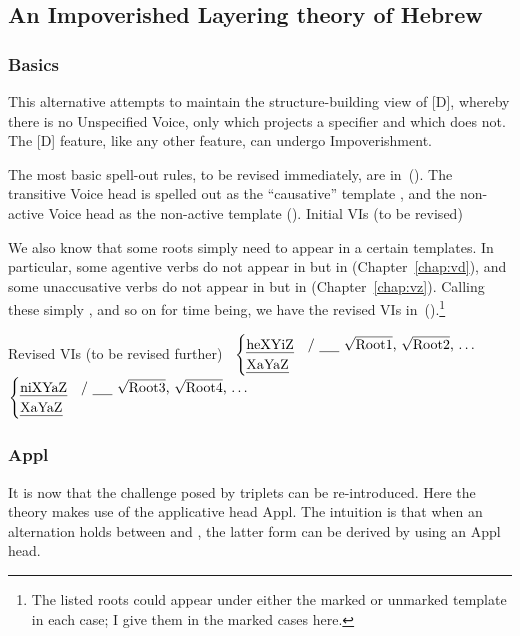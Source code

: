 	\subsection{An Impoverished Layering theory of Hebrew} \label{aas:jim:pros}
		\subsubsection{Basics}
This alternative attempts to maintain the structure-building view of [D], whereby there is no Unspecified Voice, only {\vds} which projects a specifier and {\vzs} which does not. The [D] feature, like any other feature, can undergo Impoverishment.

The most basic spell-out rules, to be revised immediately, are in~(\nextx). The transitive Voice head is spelled out as the ``causative'' template {\thif}, and the non-active Voice head as the non-active template (\tnif).
\pex Initial VIs (to be revised)
	\a {\vds} \lra~{\thif}
	\a {\vzs} \lra~{\tnif}
\xe

We also know that some roots simply need to appear in a certain templates. In particular, some agentive verbs do not appear in {\thif} but in {\tkal} (Chapter~\ref{chap:vd}), and some unaccusative verbs do not appear in {\tnif} but in {\tkal} (Chapter~\ref{chap:vz}). Calling these simply ,  and so on for time being, we have the revised VIs in~(\nextx).\footnote{The listed roots could appear under either the marked or unmarked template in each case; I give them in the marked cases here.}

\pex Revised VIs (to be revised further)
	\a {\vds} \lra~$\begin{cases}
		\text{\thif} & \text{/ \trace~\root{Root1}, \root{Root2}, \dots}\\
		\text{\tkal} & \\
		\end{cases}$
	\a {\vzs} \lra~$\begin{cases}
		\text{\tnif} & \text{/ \trace~\root{Root3}, \root{Root4}, \dots}\\
		\text{\tkal} & \\
		\end{cases}$
\xe


		\subsubsection{Appl}
It is now that the challenge posed by triplets can be re-introduced. Here the theory makes use of the applicative head Appl. The intuition is that when an alternation holds between {\tkal} and {\thif}, the latter form can be derived by using an Appl head.

